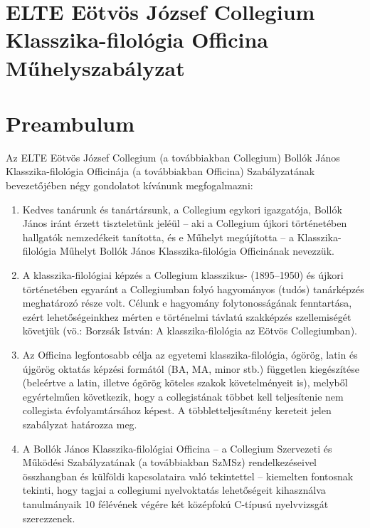 \documentclass{rulebook}
\begin{document}
\section*{ELTE Eötvös József Collegium \\ Klasszika-filológia Officina\\ \vspace{0.5em} Műhelyszabályzat} 

\vspace{2em}

\section*{Preambulum}

Az ELTE Eötvös József Collegium (a továbbiakban Collegium) Bollók János Klasszika-filológia Officinája (a továbbiakban Officina) Szabályzatának bevezetőjében négy gondolatot kívánunk megfogalmazni:

\begin{enumerate}[label=\Roman*.]
\item Kedves tanárunk és tanártársunk, a Collegium egykori igazgatója, Bollók János iránt érzett tiszteletünk jeléül – aki a Collegium újkori történetében hallgatók nemzedékeit tanította, és e Műhelyt megújította – a Klasszika-filológia Műhelyt Bollók János Klasszika-filológia Officinának nevezzük.
\item A klasszika-filológiai képzés a Collegium klasszikus- (1895–1950) és újkori történetében egyaránt a Collegiumban folyó hagyományos (tudós) tanárképzés meghatározó része volt. Célunk e hagyomány folytonosságának fenntartása, ezért lehetőségeinkhez mérten e történelmi távlatú szakképzés szellemiségét követjük (vö.: Borzsák István: A klasszika-filológia az Eötvös Collegiumban).
\item Az Officina legfontosabb célja az egyetemi klasszika-filológia, ógörög, latin és újgörög oktatás képzési formától (BA, MA, minor stb.) független kiegészítése (beleértve a latin, illetve ógörög köteles szakok követelményeit is), melyből egyértelműen következik, hogy a collegistának többet kell teljesítenie nem collegista évfolyamtársához képest. A többletteljesítmény kereteit jelen szabályzat határozza meg.
\item A Bollók János Klasszika-filológiai Officina -- a Collegium Szervezeti és Működési Szabályzatának (a továbbiakban SzMSz) rendelkezéseivel összhangban és külföldi kapcsolataira való tekintettel -- kiemelten fontosnak tekinti, hogy tagjai a collegiumi nyelvoktatás lehetőségeit kihasználva tanulmányaik 10 félévének végére két középfokú C-típusú nyelvvizsgát szerezzenek.

\end{enumerate}
\end{document}
